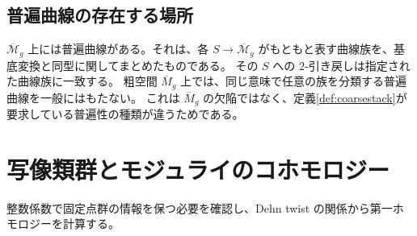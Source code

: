 \documentclass[dvipdfmx,a4paper,11pt]{article}
\theoremstyle{definition}
\newenvironment{aim}{\begin{tcolorbox}[mybox,colback=green!3,title=この章で考えること,fonttitle=\bfseries]}{\end{tcolorbox}}
\newcommand{\cM}{\overline{\mathcal M}}
\begin{document}
\subsection{普遍曲線の存在する場所}
$\cM_g$ 上には普遍曲線がある。それは、各 $S\to\cM_g$ がもともと表す曲線族を、基底変換と同型に関してまとめたものである。
その $S$ への $2$-引き戻しは指定された曲線族に一致する。
粗空間 $\overline M_g$ 上では、同じ意味で任意の族を分類する普遍曲線を一般にはもたない。
これは $\overline M_g$ の欠陥ではなく、定義\ref{def:coarsestack}が要求している普遍性の種類が違うためである。

\par\bigskip\Needspace{.70\textheight}
\section{写像類群とモジュライのコホモロジー}\label{sec:mcg}
\begin{aim}
整数係数で固定点群の情報を保つ必要を確認し、Dehn twist の関係から第一ホモロジーを計算する。
\end{aim}
\end{document}
